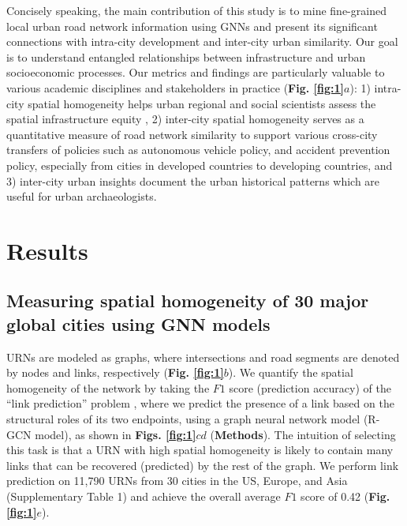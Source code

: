 \documentclass[10pt]{wlscirep}
\begin{document}
Concisely speaking, the main contribution of this study is to mine fine-grained local urban road network information using GNNs and present its significant connections with intra-city development and inter-city urban similarity. Our goal is to understand entangled relationships between infrastructure and urban socioeconomic processes. Our metrics and findings are particularly valuable to various academic disciplines and stakeholders in practice (\textbf{Fig. \ref{fig:1}$a$}): 1) intra-city spatial homogeneity helps urban regional and social scientists assess the spatial infrastructure equity \cite{hanson2004geography}, 2) inter-city spatial homogeneity serves as a quantitative measure of road network similarity to support various cross-city transfers of policies \cite{cook2008mobilising} such as autonomous vehicle policy, and accident prevention policy, especially from cities in developed countries to developing countries, and 3) inter-city urban insights document the urban historical patterns which are useful for urban archaeologists. 

\section*{Results}

\subsection*{Measuring spatial homogeneity of 30 major global cities using GNN models}
URNs are modeled as graphs, where intersections and road segments are denoted by nodes and links, respectively (\textbf{Fig. \ref{fig:1}$b$}). We quantify the spatial homogeneity of the network by taking the $F1$ score (prediction accuracy) of the “link prediction” problem \cite{ghasemian2020stacking,clauset2008hierarchical,stanfield2017drug}, where we predict the presence of a link based on the structural roles of its two endpoints, using a graph neural network model (R-GCN model)\cite{schlichtkrull2018modeling}, as shown in \textbf{Figs. \ref{fig:1}$cd$} (\textbf{Methods}). The intuition of selecting this task is that a URN with high spatial homogeneity is likely to contain many links that can be recovered (predicted) by the rest of the graph. We perform link prediction on 11,790 URNs from 30 cities in the US, Europe, and Asia (Supplementary Table 1) and achieve the overall average $F1$ score of 0.42 (\textbf{Fig. \ref{fig:1}$e$}). 
\end{document}
